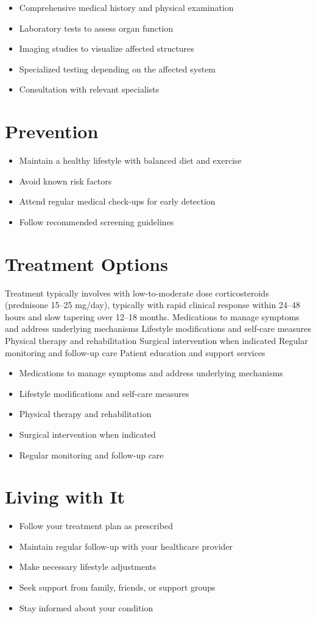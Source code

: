 \begin{itemize}[noitemsep]
  \item Comprehensive medical history and physical examination
  \item Laboratory tests to assess organ function
  \item Imaging studies to visualize affected structures
  \item Specialized testing depending on the affected system
  \item Consultation with relevant specialists
\end{itemize}
\section{Prevention}
\begin{itemize}[noitemsep]
  \item Maintain a healthy lifestyle with balanced diet and exercise
  \item Avoid known risk factors
  \item Attend regular medical check-ups for early detection
  \item Follow recommended screening guidelines
\end{itemize}
\section{Treatment Options}
Treatment typically involves with low-to-moderate dose corticosteroids (prednisone 15--25 mg/day), typically with rapid clinical response within 24--48 hours and slow tapering over 12--18 months. Medications to manage symptoms and address underlying mechanisms Lifestyle modifications and self-care measures Physical therapy and rehabilitation Surgical intervention when indicated Regular monitoring and follow-up care Patient education and support services

\begin{itemize}[noitemsep]
  \item Medications to manage symptoms and address underlying mechanisms
  \item Lifestyle modifications and self-care measures
  \item Physical therapy and rehabilitation
  \item Surgical intervention when indicated
  \item Regular monitoring and follow-up care
\end{itemize}
\section{Living with It}
\begin{itemize}[noitemsep]
  \item Follow your treatment plan as prescribed
  \item Maintain regular follow-up with your healthcare provider
  \item Make necessary lifestyle adjustments
  \item Seek support from family, friends, or support groups
  \item Stay informed about your condition
\end{itemize}
